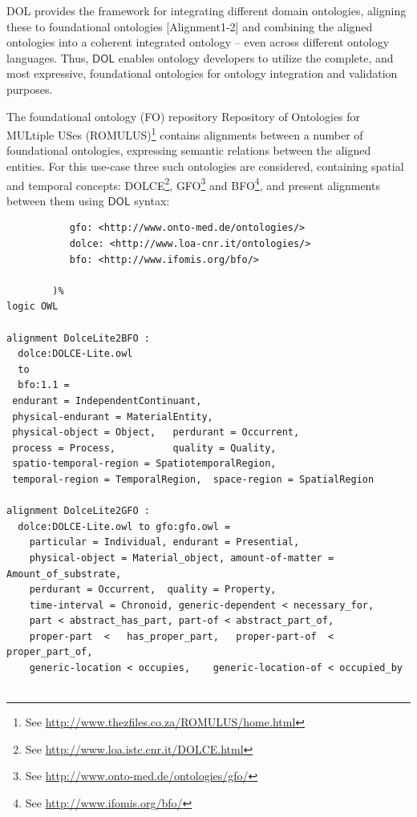 \documentclass[10pt,fleqn,final]{scrreprt}
\newcommand{\cbs}[0]{\color{red}\xspace} %
\newcommand{\cbe}[0]{\color{black}\xspace} %
\newcommand*{\DOL}{\ensuremath{\mathsf{DOL}}\xspace}
\newenvironment{definitions}[0]{\medskip }{}
\begin{document}
\begin{definitions}
DOL  provides the framework for integrating different domain ontologies, aligning these to 
foundational ontologies [Alignment1-2] and combining the aligned ontologies into a coherent 
integrated ontology -- even across different ontology languages. Thus, \DOL  enables ontology 
developers to utilize the complete, and most expressive, foundational ontologies for ontology 
integration and validation purposes. 

The foundational ontology (FO) repository Repository of Ontologies for MULtiple USes (ROMULUS)\footnote{See \url{http://www.thezfiles.co.za/ROMULUS/home.html}}
contains alignments between a number of foundational ontologies, expressing semantic relations between the aligned
entities. \cbs For this use-case three such ontologies are considered,\cbe containing spatial and temporal concepts: DOLCE\footnote{See \url{http://www.loa.istc.cnr.it/DOLCE.html}}, GFO\footnote{See \url{http://www.onto-med.de/ontologies/gfo/}} and BFO\footnote{See \url{http://www.ifomis.org/bfo/}}, and present alignments between them 
using \DOL syntax:

\begin{lstlisting}[basicstyle=\ttfamily\footnotesize,language=dolText,morekeywords={props,ObjectProperty,Class,DisjointUnionOf,SubClassOf,Characteristics,Transitive,Asymmetric,SubPropertyOf,DisjointClasses,EquivalentTo,inverse,only,forall,iff,if,or,exists,distributed,from},escapechar=@,mathescape]
%prefix(
           gfo: <http://www.onto-med.de/ontologies/>
           dolce: <http://www.loa-cnr.it/ontologies/>
           bfo: <http://www.ifomis.org/bfo/>
           
        )%
logic OWL

alignment DolceLite2BFO :
  dolce:DOLCE-Lite.owl
  to
  bfo:1.1 =
 endurant = IndependentContinuant,
 physical-endurant = MaterialEntity,
 physical-object = Object,   perdurant = Occurrent,
 process = Process,          quality = Quality,
 spatio-temporal-region = SpatiotemporalRegion,
 temporal-region = TemporalRegion,  space-region = SpatialRegion

alignment DolceLite2GFO :
  dolce:DOLCE-Lite.owl to gfo:gfo.owl =
 	particular = Individual, endurant = Presential,
 	physical-object = Material_object, amount-of-matter = Amount_of_substrate,
 	perdurant = Occurrent, 	quality = Property,
 	time-interval = Chronoid, generic-dependent < necessary_for,
 	part < abstract_has_part, part-of < abstract_part_of,
 	proper-part  <	 has_proper_part,  	proper-part-of  < proper_part_of,
 	generic-location < occupies, 	generic-location-of < occupied_by


\end{lstlisting}
\end{definitions}
\end{document}
